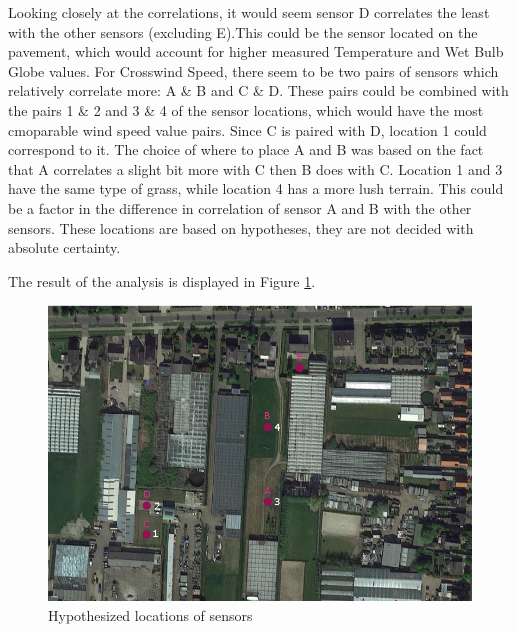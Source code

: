 \documentclass{report}
\begin{document}
	\FloatBarrier
	\begin{table}[htbp]
		\centering
		\caption{Possible causes of differences between sensors}
		\label{tab:locations}%
	\end{table}%
	\FloatBarrier
	
	Looking closely at the correlations, it would seem sensor D correlates the least with the other sensors (excluding E).This could be the sensor located on the pavement, which would account for higher measured Temperature and Wet Bulb Globe values. For Crosswind Speed, there seem to be two pairs of sensors which relatively correlate more: A \& B and C \& D. These pairs could be combined with the pairs 1 \& 2 and 3 \& 4 of the sensor locations, which would have the most cmoparable wind speed value pairs. Since C is paired with D, location 1 could correspond to it. The choice of where to place A and B was based on the fact that A correlates a slight bit more with C then B does with C. Location 1 and 3 have the same type of grass, while location 4 has a more lush terrain. This could be a factor in the difference in correlation of sensor A and B with the other sensors. These locations are based on hypotheses, they are not decided with absolute certainty.
	
	The result of the analysis is displayed in Figure \ref{fig:locations}.
	
	\begin{figure}[H]
		\includegraphics[width=\linewidth]{GEO1001_hw01_images/SensorsSketch_guess.png}
		\caption{Hypothesized locations of sensors}
		\label{fig:locations}
	\end{figure}
	
\end{document}
